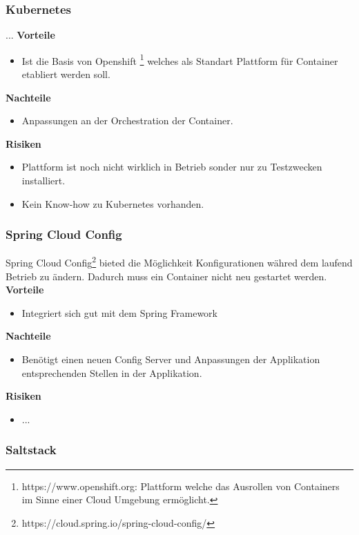 \subsubsection{Kubernetes}
...\newline
\newline
\textbf{Vorteile}
\begin{itemize}
	\item Ist die Basis von Openshift \footnote{https://www.openshift.org: Plattform welche das Ausrollen von Containers im Sinne einer Cloud Umgebung ermöglicht.} welches als Standart Plattform für Container etabliert werden soll.
\end{itemize}
\textbf{Nachteile}
\begin{itemize}
	\item Anpassungen an der Orchestration der Container.
\end{itemize}
\textbf{Risiken}
\begin{itemize}
	\item Plattform ist noch nicht wirklich in Betrieb sonder nur zu Testzwecken installiert.
	\item Kein Know-how zu Kubernetes vorhanden.
\end{itemize}
\subsubsection{Spring Cloud Config}

Spring Cloud Config\footnote{https://cloud.spring.io/spring-cloud-config/} bieted die Möglichkeit Konfigurationen währed dem laufend Betrieb zu ändern. Dadurch muss ein Container nicht neu gestartet werden.\newline
\newline
\textbf{Vorteile}
\begin{itemize}
	\item Integriert sich gut mit dem Spring Framework
\end{itemize}
\textbf{Nachteile}
\begin{itemize}
	\item Benötigt einen neuen Config Server und Anpassungen der Applikation entsprechenden Stellen in der Applikation.
\end{itemize}
\textbf{Risiken}
\begin{itemize}
	\item ...
\end{itemize}
\subsubsection{Saltstack}

